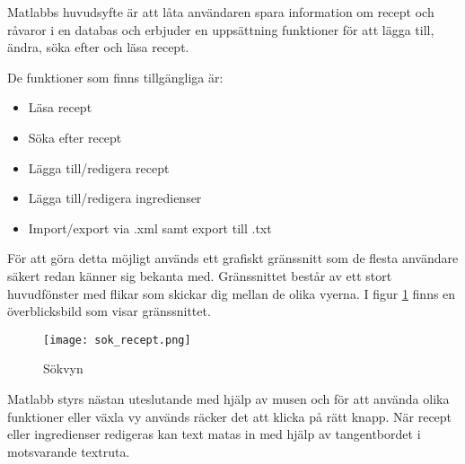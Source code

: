 Matlabbs huvudsyfte är att låta användaren spara information om recept
och råvaror i en databas och erbjuder en uppsättning funktioner för
att lägga till, ändra, söka efter och läsa recept.

De funktioner som finns tillgängliga är:
\begin{itemize}
\item Läsa recept
\item Söka efter recept
\item Lägga till/redigera recept
\item Lägga till/redigera ingredienser
\item Import/export via .xml samt export till .txt
\end{itemize}

För att göra detta möjligt används ett grafiskt gränssnitt som de
flesta användare säkert redan känner sig bekanta med. Gränssnittet
består av ett stort huvudfönster med flikar som skickar dig mellan de
olika vyerna. I figur \ref{fig:oversikt} finns en överblicksbild som
visar gränssnittet.

\begin{figure}[H]
        \centering 
        \texttt{[image: sok\_recept.png]} 
        \caption{Sökvyn} 
        \label{fig:oversikt}
\end{figure}

Matlabb styrs nästan uteslutande med hjälp av musen och för att
använda olika funktioner eller växla vy används räcker det att klicka
på rätt knapp. När recept eller ingredienser redigeras kan text matas
in med hjälp av tangentbordet i motsvarande textruta.


